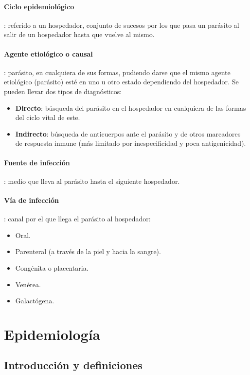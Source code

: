 \paragraph{Ciclo epidemiológico}: referido a un hospedador, conjunto de sucesos por los que pasa un parásito al salir de un hospedador hasta que vuelve al mismo.
\paragraph{Agente etiológico o causal}: parásito, en cualquiera de sus formas, pudiendo darse que el mismo agente etiológico (parásito) esté en uno u otro estado dependiendo del hospedador. Se pueden llevar dos tipos de diagnósticos:
\begin{itemize}[itemsep=0pt,parsep=0pt,topsep=0pt,partopsep=0pt]
	\item \textbf{Directo}: búsqueda del parásito en el hospedador en cualquiera de las formas del ciclo vital de este.
	\item\textbf{Indirecto}: búsqueda de anticuerpos ante el parásito y de otros marcadores de respuesta inmune (más limitado por inespecificidad y poca antigenicidad).
\end{itemize}
\paragraph{Fuente de infección}: medio que lleva al parásito hasta el siguiente hospedador.
\paragraph{Vía de infección}: canal por el que llega el parásito al hospedador:
\begin{itemize}[itemsep=0pt,parsep=0pt,topsep=0pt,partopsep=0pt]
	\item Oral.
	\item Parenteral (a través de la piel y hacia la sangre).
	\item Congénita o placentaria.
	\item Venérea.
	\item Galactógena.
\end{itemize}
\section{Epidemiología}
\subsection{Introducción y definiciones}
